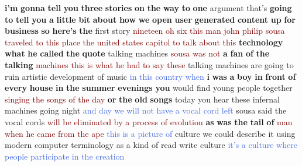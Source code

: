 \textbf{i'm} \textbf{gonna} \textbf{tell} \textbf{you} \textbf{three} \textbf{stories} \textbf{on} \textbf{the} \textbf{way} \textbf{to} \textbf{one} argument that's \textbf{going} \textbf{to} \textbf{tell} \textbf{you} \textbf{a} \textbf{little} \textbf{bit} \textbf{about} \textbf{how} \textbf{we} \textbf{open} \textbf{user} \textbf{generated} \textbf{content} \textbf{up} \textbf{for} \textbf{business} \textbf{so} \textbf{here's} \textbf{the} first story \textcolor{Maroon}{nineteen} \textcolor{Maroon}{oh} \textcolor{Maroon}{six} \textcolor{Maroon}{this} \textcolor{Maroon}{man} \textcolor{Maroon}{john} \textcolor{Maroon}{philip} \textcolor{Maroon}{sousa} \textcolor{Maroon}{traveled} \textcolor{Maroon}{to} \textcolor{Maroon}{this} \textcolor{Maroon}{place} \textcolor{Maroon}{the} \textcolor{Maroon}{united} \textcolor{Maroon}{states} \textcolor{Maroon}{capitol} \textcolor{Maroon}{to} \textcolor{Maroon}{talk} \textcolor{Maroon}{about} \textcolor{Maroon}{this} \textbf{technology} \textbf{what} \textbf{he} \textbf{called} \textbf{the} \textbf{quote} talking machines \textcolor{Maroon}{sousa} \textcolor{Maroon}{was} \textcolor{Maroon}{not} \textbf{a} \textbf{fan} \textbf{of} \textbf{the} \textbf{talking} \textcolor{Maroon}{machines} \textcolor{Maroon}{this} \textcolor{Maroon}{is} \textcolor{Maroon}{what} \textcolor{Maroon}{he} \textcolor{Maroon}{had} \textcolor{Maroon}{to} \textcolor{Maroon}{say} \textcolor{Maroon}{these} talking machines are going to ruin artistic development of music \textcolor{RoyalBlue}{in} \textcolor{RoyalBlue}{this} \textcolor{RoyalBlue}{country} \textcolor{RoyalBlue}{when} \textbf{i} \textbf{was} \textbf{a} \textbf{boy} \textbf{in} \textbf{front} \textbf{of} \textbf{every} \textbf{house} \textbf{in} \textbf{the} \textbf{summer} \textbf{evenings} \textbf{you} would find young people together \textcolor{Maroon}{singing} \textcolor{Maroon}{the} \textcolor{Maroon}{songs} \textcolor{Maroon}{of} \textcolor{Maroon}{the} \textcolor{Maroon}{day} \textbf{or} \textbf{the} \textbf{old} \textbf{songs} today you hear these infernal machines going night \textcolor{RoyalBlue}{and} \textcolor{RoyalBlue}{day} \textcolor{RoyalBlue}{we} \textcolor{RoyalBlue}{will} \textcolor{RoyalBlue}{not} \textcolor{RoyalBlue}{have} \textcolor{RoyalBlue}{a} \textcolor{RoyalBlue}{vocal} \textcolor{RoyalBlue}{cord} \textcolor{RoyalBlue}{left} sousa said the vocal cords \textcolor{Maroon}{will} \textcolor{Maroon}{be} \textcolor{Maroon}{eliminated} \textcolor{Maroon}{by} \textcolor{Maroon}{a} \textcolor{Maroon}{process} \textcolor{Maroon}{of} \textcolor{Maroon}{evolution} \textbf{as} \textbf{was} \textbf{the} \textbf{tail} \textbf{of} \textcolor{Maroon}{man} \textcolor{Maroon}{when} \textcolor{Maroon}{he} \textcolor{Maroon}{came} \textcolor{Maroon}{from} \textcolor{Maroon}{the} \textcolor{Maroon}{ape} \textcolor{RoyalBlue}{this} \textcolor{RoyalBlue}{is} \textcolor{RoyalBlue}{a} \textcolor{RoyalBlue}{picture} \textcolor{RoyalBlue}{of} culture we could describe it using modern computer terminology as a kind of read write culture \textcolor{RoyalBlue}{it's} \textcolor{RoyalBlue}{a} \textcolor{RoyalBlue}{culture} \textcolor{RoyalBlue}{where} \textcolor{RoyalBlue}{people} \textcolor{RoyalBlue}{participate} \textcolor{RoyalBlue}{in} \textcolor{RoyalBlue}{the} \textcolor{RoyalBlue}{creation} 